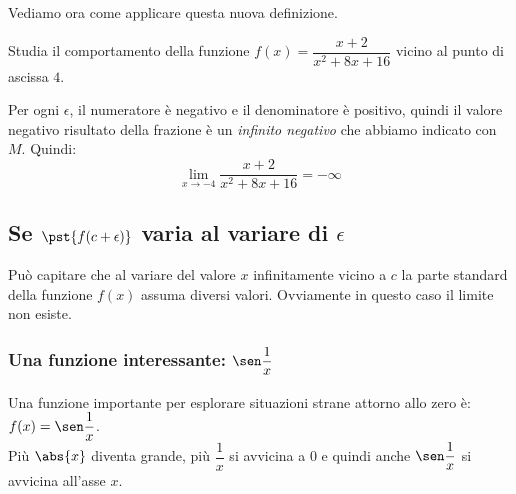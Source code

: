 Vediamo ora come applicare questa nuova definizione.

\begin{esempio}
Studia il comportamento della funzione \(f(x)=\dfrac{x+2}{x^2+8x+16}\) 
vicino al punto di ascissa \(4\).

\end{esempio}
Per ogni \(\epsilon\), il numeratore è negativo e il denominatore è 
positivo, quindi il valore negativo risultato della frazione è un 
\emph{infinito negativo} che abbiamo indicato con \(M\). 
Quindi:
\[\lim_{x \to -4} \dfrac{x+2}{x^2+8x+16} = -\infty\]

\subsection{Se \(\pst{f(c+\epsilon)}\) varia al variare di \(\epsilon\)}
\label{subsec:cont_limiti_nonsempreesiste}

Può capitare che al variare del valore \(x\) infinitamente vicino a \(c\) la 
parte standard della funzione \(f(x)\) assuma diversi valori. Ovviamente in 
questo caso il limite non esiste.

\subsubsection{Una funzione interessante: \(\sen \dfrac{1}{x}\)}

\noindent Una funzione importante per esplorare situazioni strane attorno 
allo zero è: \(f(x) = \sen \dfrac{1}{x}\).\\
Più \(\abs{x}\) diventa grande, più \(\dfrac{1}{x}\) si avvicina a \(0\) e 
quindi anche \(\sen \dfrac{1}{x}\) si avvicina all'asse \(x\).


